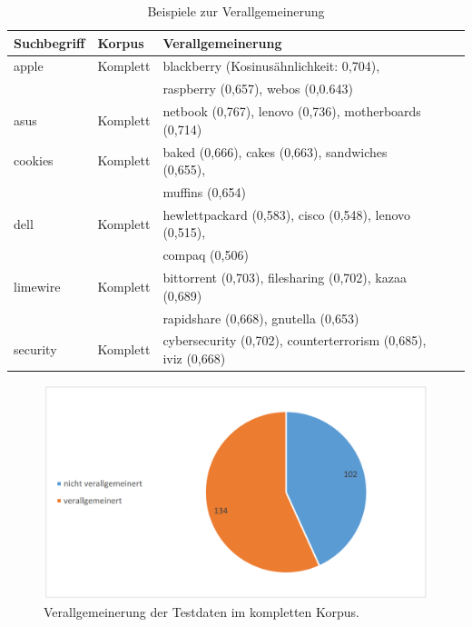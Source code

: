 \documentclass[12pt,a4paper]{report}
\begin{document}
		
\begin{table}[h]
\caption{Beispiele zur Verallgemeinerung}
\begin{center}
\begin{tabular}{|l||l|l|l|l|}
\hline
Suchbegriff & Korpus & Verallgemeinerung   \\
\hline
\hline
 apple & Komplett & blackberry (Kosinusähnlichkeit: 0,704),\\
 	&	& raspberry (0,657), webos (0,0.643)\\
 \hline
 asus	   & Komplett & netbook (0,767), lenovo (0,736), motherboards (0,714) \\
\hline
 cookies	& Komplett& baked (0,666), cakes (0,663), sandwiches (0,655),\\
 & & muffins (0,654)	\\
 	\hline
 dell	 & Komplett & hewlettpackard (0,583), cisco (0,548), lenovo (0,515),\\
 && compaq (0,506) \\
 \hline
 limewire	& Komplett& bittorrent (0,703), filesharing (0,702), kazaa (0,689)\\
 &&rapidshare (0,668), gnutella (0,653)\\
 	\hline
 security	&	Komplett&	cybersecurity (0,702), counterterrorism (0,685), iviz (0,668) \\
 	\hline
 
\end{tabular}
\end{center}
\end{table}
\begin{figure}[p]
  \begin{center}
	\includegraphics[scale=0.4]{VerallgemeinerungFull.PNG}
  \end{center}  
  \caption{Verallgemeinerung der Testdaten im kompletten Korpus.}

\end{figure}
\end{document}
